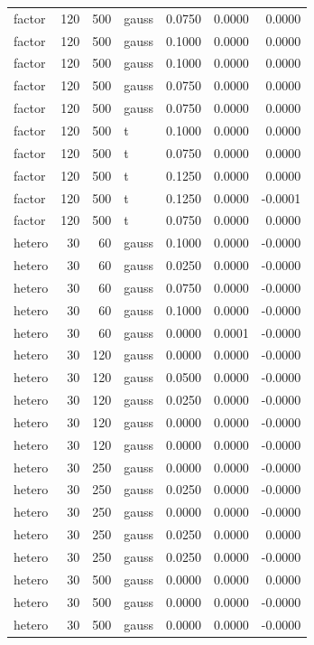 \begin{tabular}{lrrlrrr}
factor & 120 & 500 & gauss & 0.0750 & 0.0000 & 0.0000 \\
factor & 120 & 500 & gauss & 0.1000 & 0.0000 & 0.0000 \\
factor & 120 & 500 & gauss & 0.1000 & 0.0000 & 0.0000 \\
factor & 120 & 500 & gauss & 0.0750 & 0.0000 & 0.0000 \\
factor & 120 & 500 & gauss & 0.0750 & 0.0000 & 0.0000 \\
factor & 120 & 500 & t & 0.1000 & 0.0000 & 0.0000 \\
factor & 120 & 500 & t & 0.0750 & 0.0000 & 0.0000 \\
factor & 120 & 500 & t & 0.1250 & 0.0000 & 0.0000 \\
factor & 120 & 500 & t & 0.1250 & 0.0000 & -0.0001 \\
factor & 120 & 500 & t & 0.0750 & 0.0000 & 0.0000 \\
hetero & 30 & 60 & gauss & 0.1000 & 0.0000 & -0.0000 \\
hetero & 30 & 60 & gauss & 0.0250 & 0.0000 & -0.0000 \\
hetero & 30 & 60 & gauss & 0.0750 & 0.0000 & -0.0000 \\
hetero & 30 & 60 & gauss & 0.1000 & 0.0000 & -0.0000 \\
hetero & 30 & 60 & gauss & 0.0000 & 0.0001 & -0.0000 \\
hetero & 30 & 120 & gauss & 0.0000 & 0.0000 & -0.0000 \\
hetero & 30 & 120 & gauss & 0.0500 & 0.0000 & -0.0000 \\
hetero & 30 & 120 & gauss & 0.0250 & 0.0000 & -0.0000 \\
hetero & 30 & 120 & gauss & 0.0000 & 0.0000 & -0.0000 \\
hetero & 30 & 120 & gauss & 0.0000 & 0.0000 & -0.0000 \\
hetero & 30 & 250 & gauss & 0.0000 & 0.0000 & -0.0000 \\
hetero & 30 & 250 & gauss & 0.0250 & 0.0000 & -0.0000 \\
hetero & 30 & 250 & gauss & 0.0000 & 0.0000 & -0.0000 \\
hetero & 30 & 250 & gauss & 0.0250 & 0.0000 & 0.0000 \\
hetero & 30 & 250 & gauss & 0.0250 & 0.0000 & -0.0000 \\
hetero & 30 & 500 & gauss & 0.0000 & 0.0000 & 0.0000 \\
hetero & 30 & 500 & gauss & 0.0000 & 0.0000 & -0.0000 \\
hetero & 30 & 500 & gauss & 0.0000 & 0.0000 & -0.0000 \\

\end{tabular}
